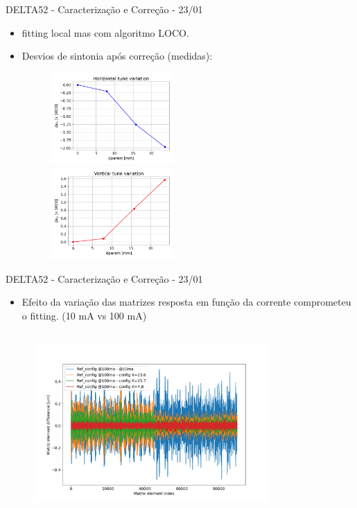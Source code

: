 \documentclass{beamer}					  %
\begin{document}
\begin{frame}{DELTA52 - Caracterização e Correção - 23/01}
    \begin{itemize}
            \item fitting local mas com algoritmo LOCO.
    		\item Desvios de sintonia após correção (medidas):
    \end{itemize}
    \begin{figure}[H]
        	\centering
            \includegraphics[height=3.5cm, width=6cm]{2024-01-26/figures/Tunex_after_loco_2401.png}\\ 
            \includegraphics[height=3.5cm, width=6cm]{2024-01-26/figures/Tuney_after_loco_2401.png}\\ 
    \end{figure} 
\end{frame}


\begin{frame}{DELTA52 - Caracterização e Correção - 23/01}
    \begin{itemize}
    		\item Efeito da variação das matrizes resposta em função da corrente comprometeu o fitting. (10 mA vs 100 mA)
    \end{itemize}
    \begin{figure}[H]
        	\centering
            \includegraphics[height=7cm, width=9cm]{2024-01-26/figures/Matriz variation.png}\\ 
    \end{figure} 
\end{frame}
\end{document}
